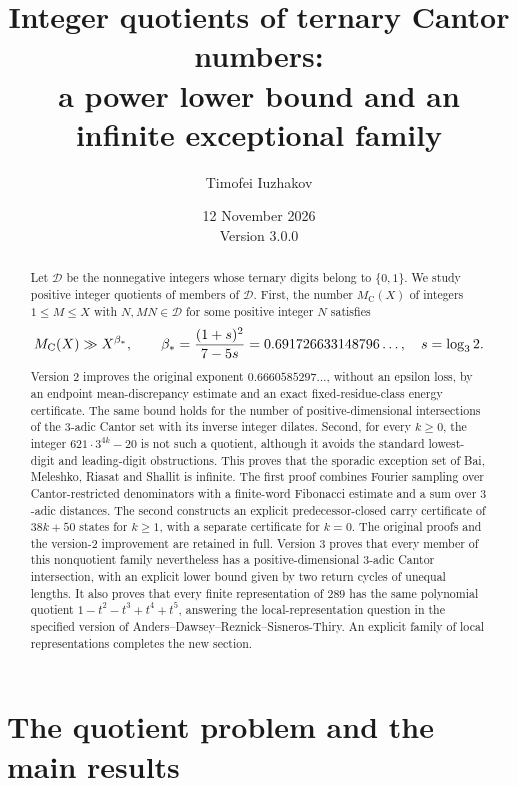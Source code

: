 \documentclass[11pt]{article}
\title{Integer quotients of ternary Cantor numbers:\\
a power lower bound and an infinite exceptional family}
\author{Timofei Iuzhakov}
\date{12 November 2026\\Version 3.0.0}
\theoremstyle{remark}
\newcommand{\D}{\mathcal D}
\newcommand{\MC}{M_{\mathrm C}}
\begin{document}
\maketitle

\begin{abstract}
Let $\D$ be the nonnegative integers whose ternary digits belong to
$\{0,1\}$. We study positive integer quotients of members of $\D$. First, the number $\MC(X)$ of integers $1\le M\le X$
with $N,MN\in\D$ for some positive integer $N$ satisfies
\[
 \MC(X)\gg X^{\beta_*},\qquad
 \beta_*={(1+s)^2\over7-5s}=0.691726633148796\ldots,
 \quad s=\log_3 2.
\]
Version 2 improves the original exponent $0.6660585297\ldots$,
without an epsilon loss, by an endpoint mean-discrepancy estimate
and an exact fixed-residue-class energy certificate.
The same bound holds for the number of positive-dimensional
intersections of the $3$-adic Cantor set with its inverse integer
dilates. Second, for every $k\ge0$, the integer
$621\cdot3^{4k}-20$ is not such a quotient, although it avoids the
standard lowest-digit and leading-digit obstructions. This proves
that the sporadic exception set of Bai, Meleshko, Riasat and Shallit
is infinite. The first proof combines Fourier sampling over
Cantor-restricted denominators with a finite-word Fibonacci estimate
and a sum over $3$-adic distances. The second constructs an explicit
predecessor-closed carry certificate of $38k+50$ states for $k\ge1$,
with a separate certificate for $k=0$. The original proofs and the version-2 improvement are retained in full.
Version 3 proves that every member of this nonquotient family nevertheless
has a positive-dimensional $3$-adic Cantor intersection, with an explicit
lower bound given by two return cycles of unequal lengths.
It also proves that every finite representation of $289$ has the same
polynomial quotient $1-t^2-t^3+t^4+t^5$, answering the local-representation
question in the specified version of Anders--Dawsey--Reznick--Sisneros-Thiry.
An explicit family of local representations completes the new section.
\end{abstract}

\section{The quotient problem and the main results}
\end{document}
